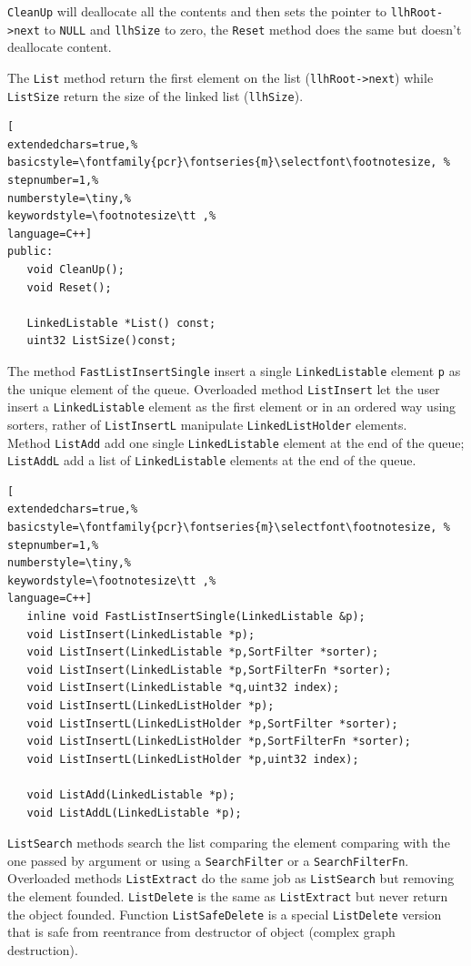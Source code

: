 \texttt{CleanUp} will deallocate all the contents and then sets the pointer to \texttt{llhRoot->next} to \texttt{NULL} and \texttt{llhSize} to zero, the \texttt{Reset} method does the same but doesn't deallocate content. 

The \texttt{List} method return the first element on the list (\texttt{llhRoot->next}) while \texttt{ListSize} return the size of the linked list (\texttt{llhSize}).

\begin{lstlisting}[
extendedchars=true,%
basicstyle=\fontfamily{pcr}\fontseries{m}\selectfont\footnotesize, %
stepnumber=1,%
numberstyle=\tiny,%
keywordstyle=\footnotesize\tt ,%
language=C++]
public:
   void CleanUp();
   void Reset();

   LinkedListable *List() const;
   uint32 ListSize()const;
\end{lstlisting}

The method \texttt{FastListInsertSingle} insert a single \texttt{LinkedListable} element \texttt{p} as the unique element of the queue.
Overloaded method \texttt{ListInsert} let the user insert a \texttt{LinkedListable} element as the first element or in an ordered way using sorters, rather of \texttt{ListInsertL} manipulate \texttt{LinkedListHolder} elements.\\


Method \texttt{ListAdd} add one single \texttt{LinkedListable} element at the end of the queue; \texttt{ListAddL} add a list of \texttt{LinkedListable} elements at the end of the queue. \\


\begin{lstlisting}[
extendedchars=true,%
basicstyle=\fontfamily{pcr}\fontseries{m}\selectfont\footnotesize, %
stepnumber=1,%
numberstyle=\tiny,%
keywordstyle=\footnotesize\tt ,%
language=C++]
   inline void FastListInsertSingle(LinkedListable &p);
   void ListInsert(LinkedListable *p);
   void ListInsert(LinkedListable *p,SortFilter *sorter);
   void ListInsert(LinkedListable *p,SortFilterFn *sorter);
   void ListInsert(LinkedListable *q,uint32 index);
   void ListInsertL(LinkedListHolder *p);
   void ListInsertL(LinkedListHolder *p,SortFilter *sorter);
   void ListInsertL(LinkedListHolder *p,SortFilterFn *sorter);
   void ListInsertL(LinkedListHolder *p,uint32 index);

   void ListAdd(LinkedListable *p);
   void ListAddL(LinkedListable *p);
\end{lstlisting}

\texttt{ListSearch} methods search the list comparing the element comparing with the one passed by argument or using a \texttt{SearchFilter} or a \texttt{SearchFilterFn}. Overloaded methods \texttt{ListExtract} do the same job as \texttt{ListSearch} but removing the element founded. \texttt{ListDelete} is the same as \texttt{ListExtract} but never return the object founded. Function \texttt{ListSafeDelete} is a special \texttt{ListDelete} version that is safe from reentrance from destructor of object (complex graph destruction). \\


